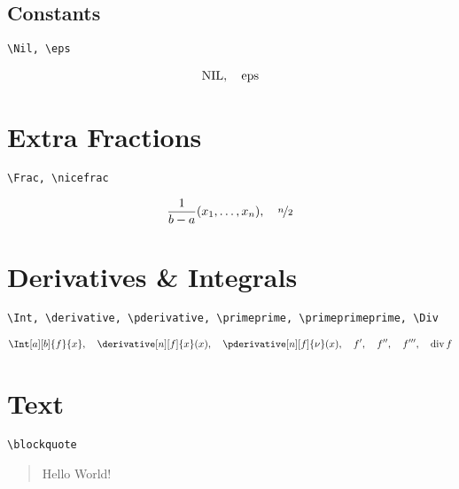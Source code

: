 \documentclass{article}
\begin{document}
\subsection{Constants}

\verb|\Nil, \eps|

\begin{align*}
    \NIL,
    \quad
    \eps
\end{align*}


\section{Extra Fractions}

\verb|\Frac, \nicefrac|

\begin{align*}
    \Frac{x_1, \dots, x_n}{b - a},
    \quad
    \nicefrac{n}{2}
\end{align*}


\section{Derivatives \& Integrals}

\verb|\Int, \derivative, \pderivative, \primeprime, \primeprimeprime, \Div|

\begin{align*}
    \Int[a][b]{f}{x},
    \quad
    \derivative[n][f]{x}(x),
    \quad
    \pderivative[n][f]{\nu}(x),
    \quad
    f^\prime,
    \quad
    f^\primeprime,
    \quad
    f^\primeprimeprime,
    \quad
    \Div f
\end{align*}


\section{Text}

\verb|\blockquote|

\begin{center}
    \blockquote{Hello World!}
\end{center}


\printbibliography
\end{document}
